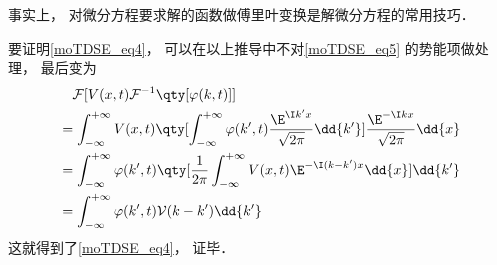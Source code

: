 事实上， 对微分方程要求解的函数做傅里叶变换是解微分方程的常用技巧． %

要证明\autoref{moTDSE_eq4}， 可以在以上推导中不对\autoref{moTDSE_eq5} 的势能项做处理， 最后变为
\begin{equation}
\begin{aligned}
&\quad\mathcal{F}[V(x, t)\mathcal{F}^{-1}\qty[\varphi(k, t)]]\\
&= \int_{-\infty}^{+\infty}V(x, t) \qty[\int_{-\infty}^{+\infty} \varphi(k', t) \frac{\E^{\I k'x}}{\sqrt{2\pi}} \dd{k'}] \frac{\E^{-\I kx}}{\sqrt{2\pi}} \dd{x}\\
&= \int_{-\infty}^{+\infty} \varphi(k', t)\qty[\frac{1}{2\pi}\int_{-\infty}^{+\infty} V(x, t)\E^{-\I (k-k')x} \dd{x}] \dd{k'}\\
&= \int_{-\infty}^{+\infty} \varphi(k', t) \mathcal{V}(k-k')  \dd{k'}
\end{aligned}
\end{equation}
这就得到了\autoref{moTDSE_eq4}， 证毕．
